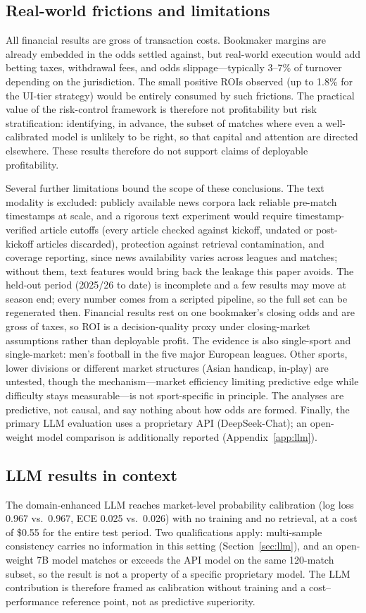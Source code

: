 \documentclass[10pt]{article}
\begin{document}
\subsection{Real-world frictions and limitations}
All financial results are gross of transaction costs. Bookmaker margins are
already embedded in the odds settled against, but real-world execution would
add betting taxes, withdrawal fees, and odds slippage---typically 3--7\% of
turnover depending on the jurisdiction. The small positive ROIs observed (up to
1.8\% for the UI-tier strategy) would be entirely consumed by such frictions.
The practical value of the risk-control framework is therefore not
profitability but risk stratification: identifying, in advance, the subset of
matches where even a well-calibrated model is unlikely to be right, so that
capital and attention are directed elsewhere. These results therefore do not
support claims of deployable profitability.

Several further limitations bound the scope of these conclusions. The
text modality is excluded: publicly available news corpora lack
reliable pre-match timestamps at scale, and a rigorous text experiment would
require timestamp-verified article cutoffs (every article checked against
kickoff, undated or post-kickoff articles discarded), protection against
retrieval contamination, and coverage reporting, since news availability varies
across leagues and matches; without them, text features would bring back the
leakage this paper avoids. The held-out period (2025/26 to date) is incomplete and
a few results may move at season end; every number comes from a scripted pipeline,
so the full set can be regenerated then. Financial results rest on one bookmaker's
closing odds and are gross of taxes, so ROI is a decision-quality proxy under
closing-market assumptions rather than deployable profit. The evidence is also
single-sport and single-market: men's football in the five major European leagues.
Other sports, lower divisions or different market structures (Asian handicap,
in-play) are untested, though the mechanism---market efficiency limiting
predictive edge while difficulty stays measurable---is not sport-specific in
principle. The analyses are predictive, not causal, and say nothing about how
odds are formed. Finally, the primary LLM evaluation uses a proprietary API
(DeepSeek-Chat); an open-weight model comparison is additionally reported
(Appendix~\ref{app:llm}).

\subsection{LLM results in context}
The domain-enhanced LLM reaches market-level probability calibration (log loss
0.967 vs.\ 0.967, ECE 0.025 vs.\ 0.026) with no training and no retrieval, at a
cost of \$0.55 for the entire test period. Two qualifications apply:
multi-sample consistency carries no information in this setting
(Section~\ref{sec:llm}), and an open-weight 7B model matches or exceeds the
API model on the same 120-match subset, so the result is not a property of a
specific proprietary model. The LLM contribution is therefore framed as
calibration without training and a cost--performance reference point, not as
predictive superiority.
\end{document}
